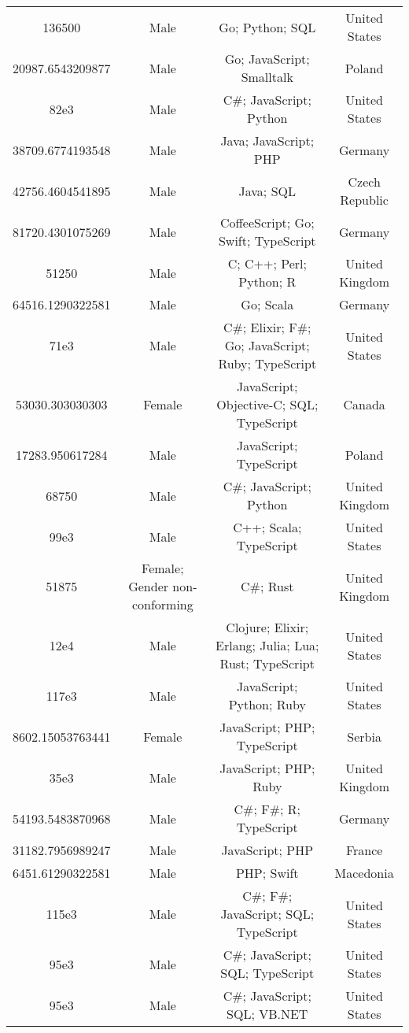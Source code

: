 \begin{center}
\begin{tabular}{ |c|c|c|c| }
136500  &  Male  &  Go; Python; SQL  &  United States  \\ 
20987.6543209877  &  Male  &  Go; JavaScript; Smalltalk  &  Poland  \\ 
82e3  &  Male  &  C\#; JavaScript; Python  &  United States  \\ 
38709.6774193548  &  Male  &  Java; JavaScript; PHP  &  Germany  \\ 
42756.4604541895  &  Male  &  Java; SQL  &  Czech Republic  \\ 
81720.4301075269  &  Male  &  CoffeeScript; Go; Swift; TypeScript  &  Germany  \\ 
51250  &  Male  &  C; C++; Perl; Python; R  &  United Kingdom  \\ 
64516.1290322581  &  Male  &  Go; Scala  &  Germany  \\ 
71e3  &  Male  &  C\#; Elixir; F\#; Go; JavaScript; Ruby; TypeScript  &  United States  \\ 
53030.303030303  &  Female  &  JavaScript; Objective-C; SQL; TypeScript  &  Canada  \\ 
17283.950617284  &  Male  &  JavaScript; TypeScript  &  Poland  \\ 
68750  &  Male  &  C\#; JavaScript; Python  &  United Kingdom  \\ 
99e3  &  Male  &  C++; Scala; TypeScript  &  United States  \\ 
51875  &  Female; Gender non-conforming  &  C\#; Rust  &  United Kingdom  \\ 
12e4  &  Male  &  Clojure; Elixir; Erlang; Julia; Lua; Rust; TypeScript  &  United States  \\ 
117e3  &  Male  &  JavaScript; Python; Ruby  &  United States  \\ 
8602.15053763441  &  Female  &  JavaScript; PHP; TypeScript  &  Serbia  \\ 
35e3  &  Male  &  JavaScript; PHP; Ruby  &  United Kingdom  \\ 
54193.5483870968  &  Male  &  C\#; F\#; R; TypeScript  &  Germany  \\ 
31182.7956989247  &  Male  &  JavaScript; PHP  &  France  \\ 
6451.61290322581  &  Male  &  PHP; Swift  &  Macedonia  \\ 
115e3  &  Male  &  C\#; F\#; JavaScript; SQL; TypeScript  &  United States  \\ 
95e3  &  Male  &  C\#; JavaScript; SQL; TypeScript  &  United States  \\ 
95e3  &  Male  &  C\#; JavaScript; SQL; VB.NET  &  United States  \\ 

\end{tabular}
\end{center}
